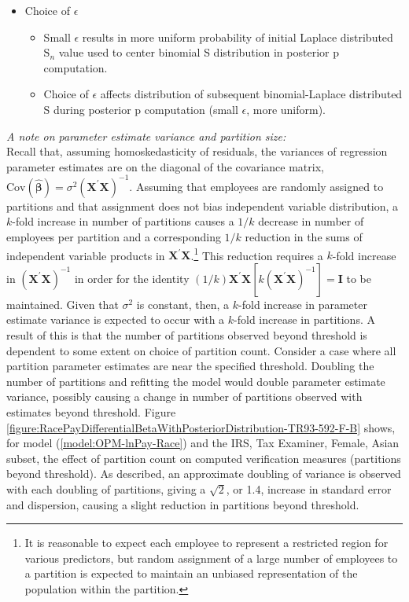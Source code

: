 \documentclass[10pt, letterpaper]{article}
\newcommand{\mtm}[2]{\bm{#1}^{\prime}\bm{#2}}
\newcommand{\mest}[1]{\hat{\bm{#1}}}
\begin{document}
\begin{spacing}{1.0}
\begin{itemize}
    \item Choice of $\epsilon$
    \begin{itemize}
        \item Small $\epsilon$ results in more uniform probability of initial Laplace distributed $\text{S}_n$ value used to center binomial S distribution in posterior p computation.
        \item Choice of $\epsilon$ affects distribution of subsequent binomial-Laplace distributed S during posterior p computation (small $\epsilon$, more uniform).
    \end{itemize}

\end{itemize}

\vspace{20pt}

\textit{A note on parameter estimate variance and partition size:}\\

Recall that, assuming homoskedasticity of residuals, the variances of regression parameter estimates are on the diagonal of the covariance matrix,  $\text{Cov}(\mest{\beta})=\sigma^2(\mtm{X}{X})^{-1}$.  Assuming that employees are randomly assigned to partitions and that assignment does not bias independent variable distribution, a $k$-fold increase in number of partitions causes a $1/k$ decrease in number of employees per partition and a corresponding $1/k$ reduction in the sums of independent variable products in $\mtm{X}{X}$.\footnote{It is reasonable to expect each employee to represent a restricted region for various predictors, but random assignment of a large number of employees to a partition is expected to maintain an unbiased representation of the population within the partition.}  This reduction requires a $k$-fold increase in $(\mtm{X}{X})^{-1}$ in order for the identity $(1/k)\mtm{X}{X}[k(\mtm{X}{X})^{-1}]=\textbf{I}$ to be maintained.  Given that $\sigma^2$ is constant, then, a $k$-fold increase in parameter estimate variance is expected to occur with a $k$-fold increase in partitions.  A result of this is that the number of partitions observed beyond threshold is dependent to some extent on choice of partition count.  Consider a case where all partition parameter estimates are near the specified  threshold.  Doubling the number of partitions and refitting the model would double parameter estimate variance, possibly causing a change in number of partitions observed with estimates beyond threshold.  Figure  \ref{figure:RacePayDifferentialBetaWithPosteriorDistribution-TR93-592-F-B} shows, for model (\ref{model:OPM-lnPay-Race}) and the IRS, Tax Examiner, Female, Asian subset, the effect of partition count on computed verification measures (partitions beyond threshold).  As described, an approximate doubling of variance is observed with each doubling of partitions, giving a $\sqrt{2}$, or 1.4, increase in standard error and dispersion, causing a slight reduction in partitions beyond threshold.


\end{spacing}
\end{document}
